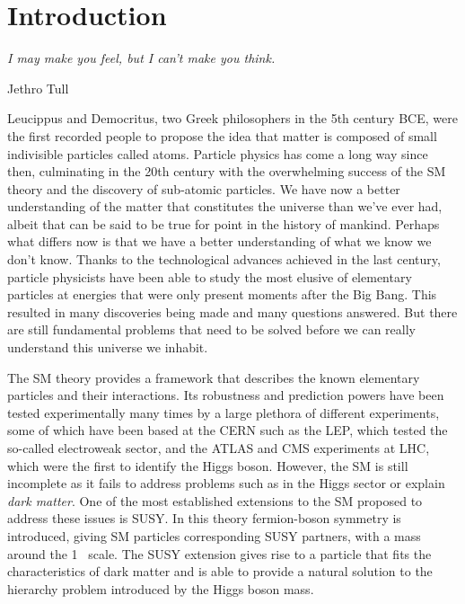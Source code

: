 \chapter*{Introduction}
\epigraph{\emph{I may make you feel, but I can't make you think.}}{Jethro Tull}

Leucippus and Democritus, two Greek philosophers in the 5th century BCE, were the first recorded people to propose the idea that matter is composed of small indivisible particles called atoms.%
Particle physics has come a long way since then, culminating in the 20th century with the overwhelming success of the \ac{SM}~\cite{MartinB.R.BrianRobert1997Pp} theory and the discovery of sub-atomic particles. 
We have now a better understanding of the matter that constitutes the universe than we've ever had, albeit that can be said to be true for point in the history of mankind. Perhaps what differs now is that we have a better understanding of what we know we don't know. 
Thanks to the technological advances achieved in the last century, particle physicists have been able to study the most elusive of elementary particles at energies that were only present moments after the Big Bang. 
This resulted in many discoveries being made and many questions answered. 
But there are still fundamental problems that need to be solved before we can really understand this universe we inhabit.

The \ac{SM} theory provides a framework that describes the known elementary particles and their interactions. 
Its robustness and prediction powers have been tested experimentally many times by a large plethora of different experiments, some of which have been based at the \ac{CERN} such as the \ac{LEP}, which tested the so-called electroweak sector, and the \ac{ATLAS} and \ac{CMS} experiments at \ac{LHC}, which were the first to identify the Higgs boson. 
However, the \ac{SM} is still incomplete as it fails to address problems such as in the Higgs sector or explain \textit{dark matter}. 
One of the most established extensions to the \ac{SM} proposed to address these issues is \ac{SUSY}. 
In this theory fermion-boson symmetry is introduced, giving \ac{SM} particles corresponding \ac{SUSY} partners, with a mass around the 1 \tev\ scale.
The \ac{SUSY} extension gives rise to a particle that fits the characteristics of dark matter and is able to provide a natural solution to the hierarchy problem introduced by the Higgs boson mass.

